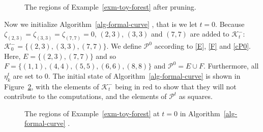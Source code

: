 \documentclass[
  11pt,
  a4paper,
]{article}
\theoremstyle{definition}
\theoremstyle{plain}
\theoremstyle{plain}
\theoremstyle{plain}
\theoremstyle{definition}
\theoremstyle{remark}
\begin{document}
\begin{figure}


\caption{\label{fig-pruned}The regions of Example~\ref{exm-toy-forest}
after pruning.}

\end{figure}%

Now we initialize  Algorithm~\ref{alg-formal-curve} , that is we let
\(t=0\). Because \(\zeta_{(2, 3)}=\zeta_{(3, 3)}=\zeta_{(7,7)}=0\),
\((2,3)\), \((3,3)\) and \((7, 7)\) are added to \(\mathcal{K}^-_t\):
\(\mathcal{K}^-_0=\{(2, 3), (3, 3), (7, 7)\}\). We define
\(\mathcal{P}^0\) according to \eqref{E}, \eqref{F} and \eqref{cP0}.
Here, \(E=\{(2,3), (7,7)\}\) and so
\(F=\{(1,1), (4,4), (5,5), (6,6), (8,8)\}\) and
\(\mathcal{P}^0=E\cup F\). Furthermore, all \(\eta_k^t\) are set to 0.
The initial state of  Algorithm~\ref{alg-formal-curve}  is shown in
Figure~\ref{fig-t0}, with the elements of \(\mathcal{K}^-_t\) being in
red to show that they will not contribute to the computations, and the
elements of \(\mathcal{P}^t\) as squares.

\begin{figure}


\caption{\label{fig-t0}The regions of Example~\ref{exm-toy-forest} at
\(t=0\) in  Algorithm~\ref{alg-formal-curve} .}

\end{figure}%
\end{document}
